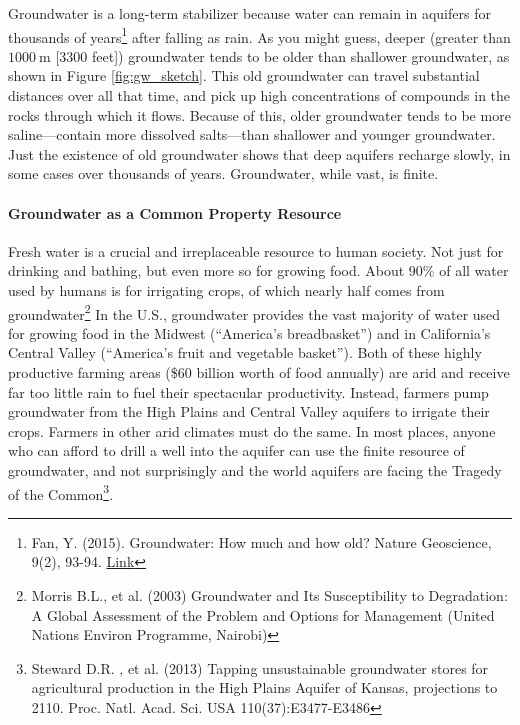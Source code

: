 Groundwater is a long-term stabilizer because water can remain in aquifers for thousands of years\footnote{Fan, Y. (2015). Groundwater: How much and how old? Nature Geoscience, 9(2), 93-94. \href{https://doi.org/10.1038/ngeo2609}{Link}} after falling as rain. As you might guess, deeper (greater than $\SI{1000}{\metre}$ [3300 feet]) groundwater tends to be older than shallower groundwater, as shown in Figure \ref{fig:gw_sketch}. This old groundwater can travel substantial distances over all that time, and pick up high concentrations of compounds in the rocks through which it flows. Because of this, older groundwater tends to be more saline---contain more dissolved salts---than shallower and younger groundwater. Just the existence of old groundwater shows that deep aquifers recharge slowly, in some cases over thousands of years. Groundwater, while vast, is finite. 

\paragraph{Groundwater as a Common Property Resource}
Fresh water is a crucial and irreplaceable resource to human society. Not just for drinking and bathing, but even more so for growing food. About 90\% of all water used by humans is for irrigating crops, of which nearly half comes from groundwater\footnote{Morris B.L., et al. (2003) Groundwater and Its Susceptibility to Degradation: A Global Assessment of the Problem and Options for Management (United Nations Environ Programme, Nairobi)} In the U.S., groundwater provides the vast majority of water used for growing food in the Midwest (``America's breadbasket'') and in California's Central Valley (``America's fruit and vegetable basket''). Both of these highly productive farming areas (\$60 billion worth of food annually) are arid and receive far too little rain to fuel their spectacular productivity. Instead, farmers pump groundwater from the High Plains and Central Valley aquifers to irrigate their crops. Farmers in other arid climates must do the same. In most places, anyone who can afford to drill a well into the aquifer can use the finite resource of groundwater, and not surprisingly and the world aquifers are facing the Tragedy of the Common\footnote{Steward D.R. , et al. (2013) Tapping unsustainable groundwater stores for agricultural production in the High Plains Aquifer of Kansas, projections to 2110. Proc. Natl. Acad. Sci. USA 110(37):E3477-E3486}. 

